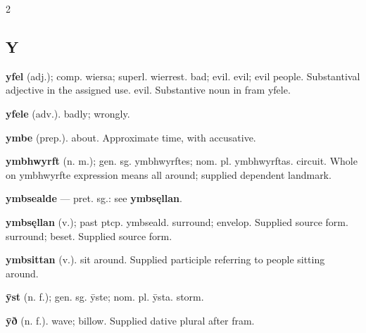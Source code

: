 \begin{multicols*}{2}
\subsection*{Y}
\textbf{yfel} (adj.); comp. wiersa; superl. wierrest. bad; evil. evil; evil people. Substantival adjective in the assigned use. evil. Substantive noun in fram yfele.\par
\textbf{yfele} (adv.). badly; wrongly.\par
\textbf{ymbe} (prep.). about. Approximate time, with accusative.\par
\textbf{ymbhwyrft} (n. m.); gen. sg. ymbhwyrftes; nom. pl. ymbhwyrftas. circuit. Whole on ymbhwyrfte expression means all around; supplied dependent landmark.\par
\textbf{ymbsealde} — pret. sg.: see \textbf{ymbsęllan}.\par
\textbf{ymbsęllan} (v.); past ptcp. ymbseald. surround; envelop. Supplied source form. surround; beset. Supplied source form.\par
\textbf{ymbsittan} (v.). sit around. Supplied participle referring to people sitting around.\par
\textbf{ȳst} (n. f.); gen. sg. ȳste; nom. pl. ȳsta. storm.\par
\textbf{ȳð} (n. f.). wave; billow. Supplied dative plural after fram.\par
\end{multicols*}
\clearpage
